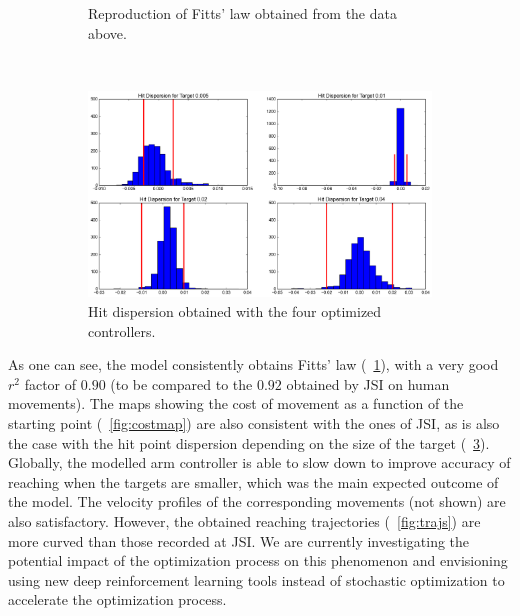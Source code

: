 \begin{figure}[t!]
\begin{subfigure}[t]{0.45\textwidth}
    \caption{Reproduction of Fitts' law obtained from the data above.\label{fig:fitts}}
  \end{subfigure}%
  ~ 
  \begin{subfigure}[t]{0.45\textwidth}
    \centering
    \includegraphics[width=0.9\linewidth]{images/hitdisp.png}
    \caption{Hit dispersion obtained with the four optimized controllers.\label{fig:hitdisp}}
  \end{subfigure}%
  \caption{}
\end{figure}

As one can see, the model consistently obtains Fitts' law (\figurename~\ref{fig:fitts}), with a very good $r^2$ factor of $0.90$ (to be compared to the $0.92$ obtained by JSI on human movements). The maps showing the cost of movement as a function of the starting point (\figurename~\ref{fig:costmap}) are also consistent with the ones of JSI, as is also the case with the hit point dispersion depending on the size of the target (\figurename~\ref{fig:hitdisp}). Globally, the modelled arm controller is able to slow down to improve accuracy of reaching when the targets are smaller, which was the main expected outcome of the model. The velocity profiles of the corresponding movements (not shown) are also satisfactory.
However, the obtained reaching trajectories (\figurename~\ref{fig:trajs}) are more curved than those recorded at JSI. We are currently investigating the potential impact of the optimization process on this phenomenon and envisioning using new deep reinforcement learning tools \cite{lillicrap2015continuous} instead of stochastic optimization \cite{hansen2003reducing} to accelerate the optimization process.
 


 
